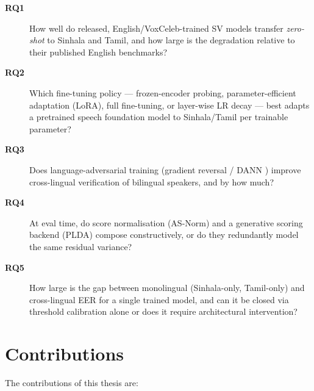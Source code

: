\begin{description}
    \item[\textbf{RQ1}] How well do released, English/VoxCeleb-trained
    SV models transfer \emph{zero-shot} to Sinhala and Tamil, and how
    large is the degradation relative to their published English
    benchmarks?
    \item[\textbf{RQ2}] Which fine-tuning policy — frozen-encoder
    probing, parameter-efficient adaptation (LoRA), full fine-tuning,
    or layer-wise LR decay — best adapts a pretrained speech
    foundation model to Sinhala/Tamil per trainable parameter?
    \item[\textbf{RQ3}] Does language-adversarial training (gradient
    reversal / DANN \cite{ganin2015dann}) improve cross-lingual
    verification of bilingual speakers, and by how much?
    \item[\textbf{RQ4}] At eval time, do score normalisation (AS-Norm)
    and a generative scoring backend (PLDA) compose constructively, or
    do they redundantly model the same residual variance?
    \item[\textbf{RQ5}] How large is the gap between monolingual
    (Sinhala-only, Tamil-only) and cross-lingual EER for a single
    trained model, and can it be closed via threshold calibration
    alone or does it require architectural intervention?
\end{description}

\section{Contributions}
\label{sec:contributions}

The contributions of this thesis are:

